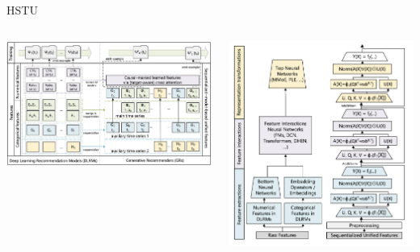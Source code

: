 \documentclass[11pt,aspectratio=169,handout]{beamer}
\begin{document}
\begin{frame}{HSTU \cite{zhai2024actions}}

\begin{columns}
\begin{column}{0.5\textwidth} 
\begin{center}
\includegraphics[scale=0.20]{images/hstu_arch.png}
\end{center}
\end{column}

\begin{column}{0.5\textwidth}
\begin{center}
\includegraphics[scale=0.20]{images/hstu_block.png}
\end{center}
\end{column}
\end{columns}


\end{frame}
\end{document}

